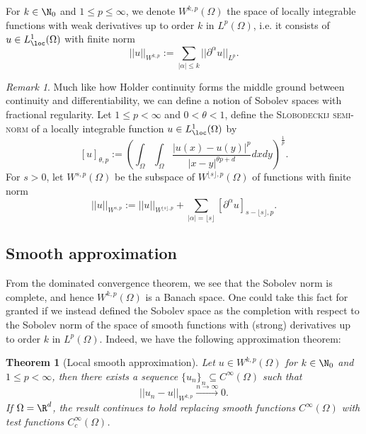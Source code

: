 \documentclass[reqno]{amsart}
\newtheorem{theorem}{Theorem}
\theoremstyle{definition}
\theoremstyle{remark}
\newtheorem*{remark}{Remark}
\renewcommand{\emph}{\textsc}
\begin{document}
For $k \in \N_0$ and $1 \leq p \leq \infty$, we denote $W^{k, p} (\Omega)$ the space of locally integrable functions with weak derivatives up to order $k$ in $L^p (\Omega)$, i.e. it consists of $u \in L^1_\loc (\Omega)$ with finite norm
	\[ ||u||_{W^{k, p}} := \sum_{|\alpha| \leq k} || \partial^\alpha u ||_{L^p}. \]
\begin{remark}
	Much like how Holder continuity forms the middle ground between continuity and differentiability, we can define a notion of Sobolev spaces with fractional regularity. Let $1 \leq p < \infty$ and $0 < \theta < 1$, define the \emph{Slobodeckij semi-norm} of a locally integrable function $u \in L^1_\loc (\Omega)$ by 
	\[ [u]_{\theta, p} := \left( \int_\Omega \int_\Omega \frac{|u(x) - u(y)|^p}{|x - y|^{\theta p + d}} dx dy \right)^{\frac1p}. \]
For $s > 0$, let $W^{s, p} (\Omega)$ be the subspace of $W^{\lfloor s \rfloor, p} (\Omega)$ of functions with finite norm
	\[ ||u||_{W^{s, p}} := || u ||_{W^{\lfloor s \rfloor, p}} + \sum_{|\alpha| = \lfloor s \rfloor} [\partial^\alpha u]_{s - \lfloor s \rfloor, p}.  \]
\end{remark}	

\subsection{Smooth approximation}
	
From the dominated convergence theorem, we see that the Sobolev norm is complete, and hence $W^{k, p} (\Omega)$ is a Banach space. One could take this fact for granted if we instead defined the Sobolev space as the completion with respect to the Sobolev norm of the space of smooth functions with (strong) derivatives up to order $k$ in $L^p (\Omega)$. Indeed, we have the following approximation theorem:

\begin{theorem}[Local smooth approximation]
	Let $u \in W^{k, p} (\Omega)$ for $k \in \N_0$ and $1 \leq p < \infty$, then there exists a sequence $\{u_n\}_n \subseteq C^\infty (\Omega)$ such that 
		\[ ||u_n - u||_{W^{k, p}} \overset{n \to \infty}{\longrightarrow} 0. \]
	If $\Omega = \R^d$, the result continues to hold replacing smooth functions $C^\infty (\Omega)$ with test functions $C^\infty_c (\Omega)$. 	
\end{theorem}
\end{document}
